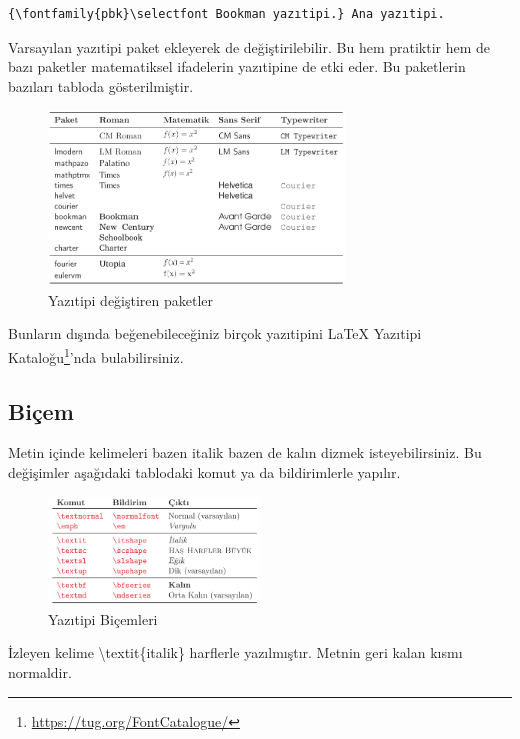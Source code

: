 \documentclass[
  10pt,
]{scrbook}
\newenvironment{Shaded}{}{}
\newcommand{\FunctionTok}[1]{\textcolor[rgb]{0.02,0.16,0.49}{#1}}
\newcommand{\NormalTok}[1]{#1}
\renewcommand{\href}[2]{#2\footnote{\url{#1}}}
\theoremstyle{definition}
\theoremstyle{definition}
\theoremstyle{definition}
\theoremstyle{definition}
\theoremstyle{remark}
\begin{document}
\begin{verbatim}
{\fontfamily{pbk}\selectfont Bookman yazıtipi.} Ana yazıtipi.
\end{verbatim}

Varsayılan yazıtipi paket ekleyerek de değiştirilebilir. Bu hem pratiktir hem de bazı paketler matematiksel ifadelerin yazıtipine de etki eder. Bu paketlerin bazıları tabloda gösterilmiştir.

\begin{figure}
\centering
\includegraphics[width=0.7\textwidth,height=\textheight]{images/yazitipi6.png}
\caption{Yazıtipi değiştiren paketler}
\end{figure}

Bunların dışında beğenebileceğiniz birçok yazıtipini \href{https://tug.org/FontCatalogue/}{LaTeX Yazıtipi Kataloğu}'nda bulabilirsiniz.

\hypertarget{biuxe7em}{%
\subsection{Biçem}\label{biuxe7em}}

Metin içinde kelimeleri bazen italik bazen de kalın dizmek isteyebilirsiniz. Bu değişimler aşağıdaki tablodaki komut ya da bildirimlerle yapılır.

\begin{figure}
\centering
\includegraphics[width=0.5\textwidth,height=\textheight]{images/yazitipi7.png}
\caption{Yazıtipi Biçemleri}
\end{figure}

\begin{Shaded}
\begin{Highlighting}[]
\NormalTok{İzleyen kelime }\FunctionTok{\textbackslash{}textit}\NormalTok{\{italik\} }
\NormalTok{harflerle yazılmıştır.}
\NormalTok{Metnin geri kalan kısmı}
\NormalTok{normaldir.}
\end{Highlighting}
\end{Shaded}
\end{document}
